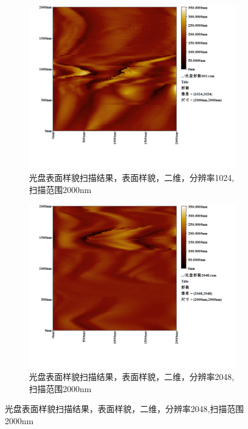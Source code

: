 \documentclass{ctexart}
\begin{document}
\begin{figure}[H]
  \centering
  \begin{subfigure}{.49\textwidth}
    \centering
    \includegraphics[width=\linewidth]{AFM结果图像/光盘表面样貌_1024_2000nm}
    \caption{光盘表面样貌扫描结果，表面样貌，二维，分辨率1024,扫描范围2000nm}
  \end{subfigure}
  \begin{subfigure}{.49\textwidth}
    \centering
    \includegraphics[width=\linewidth]{AFM结果图像/光盘表面样貌_2048_2000nm}
    \caption{光盘表面样貌扫描结果，表面样貌，二维，分辨率2048,扫描范围2000nm}
  \end{subfigure}
\end{figure}
\end{document}
